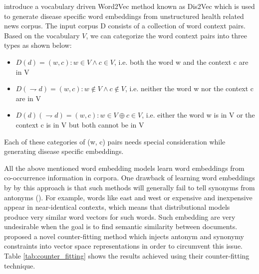 \cite{ghosh2016characterizing} introduce a vocabulary driven Word2Vec method known as Dis2Vec which is
 used to generate disease specific word embeddings from unstructured health
 related news corpus. The input corpus D consists of a collection of word context pairs. Based on the vocabulary $V$, we can categorize the word context pairs into three types as shown
 below:
 \\
 \begin{itemize}
 	\item $ D(d) = {(w, c): w \in V ∧c \in V }$, i.e. both the word w and the context c are in V
 	\item $D(\rightharpoondown d) = {(w, c): w \notin V ∧c \notin V }$, i.e. neither the word w nor the context c are in V
 	\item $D(d)(\rightharpoondown d) = {(w, c): w \in V \oplus c \in V }$, i.e. either the word w is in V or the context c is in V but both cannot be in V
 \end{itemize}
 
 Each of these categories of (w, c) pairs
 needs special consideration while generating disease specific embeddings.
 
 
 All the above mentioned word embedding models learn word embeddings from co-occurrence information in corpora.
 One drawback of learning word embeddings by by this approach is that such methods will generally fail to tell synonyms from
 antonyms (\cite{mohammad2008computing}). For example, words like east and west
 or expensive and inexpensive appear in near-identical contexts, which means
 that distributional models produce very similar word vectors for such words. Such embedding are very undesirable when the goal is to find semantic similarity between documents. 
 \cite{mrksic:2016:naacl} proposed a novel counter-fitting method which injects antonym and
 synonymy constraints into vector space representations in order to circumvent this issue. Table \ref{tab:counter_fitting} shows the results \cite{mrksic:2016:naacl} achieved using their counter-fitting technique.
 
